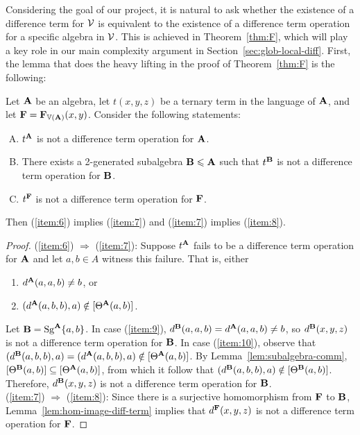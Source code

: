 Considering the goal of our project, it is natural
to ask whether the existence of a difference term for
 $\mathcal{V}$ is equivalent to the  existence  of a difference term
operation for a specific algebra in $\mathcal{V}$.  This is achieved in
Theorem~\ref{thm:F}, which will play a key role
in our main complexity argument in Section~\ref{sec:glob-local-diff}.
First, the lemma that does the heavy lifting in the proof of 
Theorem~\ref{thm:F} is the following:
\begin{lem}
  \label{lem:equiv-cond-exist-1}
  Let $\mathbf{A}$ be an algebra, let $t(x,y,z)$ be a ternary term in the language
  of $\mathbf{A}$, and let $\mathbf{F} = \mathbf{F}_{\operatorname{\mathbb{V}}(\mathbf{A})}(x,y)$. Consider the following statements:
  \begin{enumerate}[(A)]
  \item \label{item:6} $t^{\mathbf{A}}$ is not a difference term operation for $\mathbf{A}$.
  \item \label{item:7} There exists a 2-generated subalgebra $\mathbf{B} \leqslant \mathbf{A}$
    such that $t^{\mathbf{B}}$ is not a difference term operation for $\mathbf{B}$.
  \item \label{item:8} $t^{\mathbf{F}}$ is not a difference term operation for $\mathbf{F}$.
  \end{enumerate}
  Then (\ref{item:6}) implies (\ref{item:7}) and (\ref{item:7}) implies (\ref{item:8}).
\end{lem}
\begin{proof}
  (\ref{item:6}) $\Rightarrow $ (\ref{item:7}):
  Suppose  $t^{\mathbf{A}}$ fails to be a difference term operation for $\mathbf{A}$ and let $a, b \in
  A$ witness this failure. That is, either
  \begin{enumerate}
  \item\label{item:9} $d^{\mathbf{A}}(a,a,b) \neq b$, or
  \item\label{item:10} $(d^{\mathbf{A}}(a,b,b), a) \notin [\Theta^{\mathbf{A}} (a, b)]$.
  \end{enumerate}
  Let $\mathbf{B} = \operatorname{Sg}^{\mathbf{A}} \{a, b\}$.  In case
  (\ref{item:9}), 
  $d^{\mathbf{B}}(a,a,b) = d^{\mathbf{A}}(a,a,b) \neq b$, so $d^{\mathbf{B}}(x,y,z)$ is not a difference
  term operation for $\mathbf{B}$.
  In case (\ref{item:10}), observe that
  $(d^{\mathbf{B}}(a,b,b), a) = (d^{\mathbf{A}}(a,b,b), a)\notin [\Theta^{\mathbf{A}} (a, b)]$.
  By Lemma~\ref{lem:subalgebra-comm}, $[\Theta^{\mathbf{B}} (a, b)] \subseteq [\Theta^{\mathbf{A}} (a, b)]$,
  from which it follow that $(d^{\mathbf{B}}(a,b,b), a) \notin [\Theta^{\mathbf{B}} (a, b)]$.
  Therefore, $d^{\mathbf{B}}(x,y,z)$ is not a difference term operation for $\mathbf{B}$.
  \\[4pt]
  (\ref{item:7}) $\Rightarrow$ (\ref{item:8}):
  Since there is a surjective homomorphism from $\mathbf{F}$ to $\mathbf{B}$,
  Lemma~\ref{lem:hom-image-diff-term} implies that $d^{\mathbf{F}}(x,y,z)$ 
  is not a difference term operation for $\mathbf{F}$.
\end{proof}

